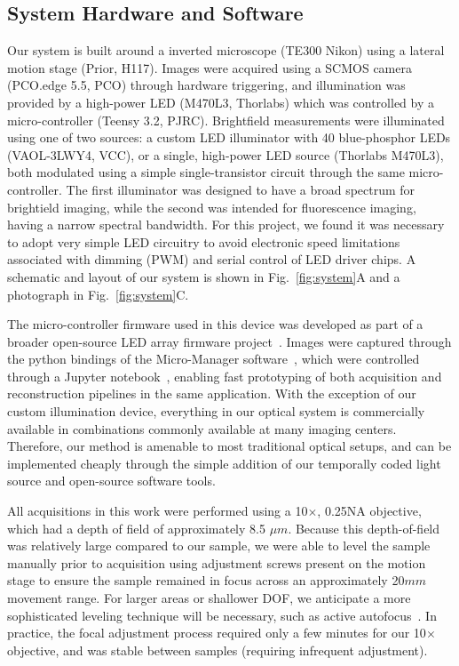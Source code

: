 \subsection{System Hardware and Software} \label{Sec:hardware}
Our system is built around a inverted microscope (TE300 Nikon) using a lateral motion stage (Prior, H117). Images were acquired using a SCMOS camera (PCO.edge 5.5, PCO) through hardware triggering, and illumination was provided by a high-power LED (M470L3, Thorlabs) which was controlled by a micro-controller (Teensy 3.2, PJRC). Brightfield measurements were illuminated using one of two sources: a custom LED illuminator with 40 blue-phosphor LEDs (VAOL-3LWY4, VCC), or a single, high-power LED source (Thorlabs M470L3), both modulated using a simple single-transistor circuit through the same micro-controller. The first illuminator was designed to have a broad spectrum for brightield imaging, while the second was intended for fluorescence imaging, having a narrow spectral bandwidth. For this project, we found it was necessary to adopt very simple LED circuitry to avoid electronic speed limitations associated with dimming (PWM) and serial control of LED driver chips. A schematic and layout of our system is shown in Fig.~\ref{fig:system}A and a photograph in Fig.~\ref{fig:system}C.

The micro-controller firmware used in this device was developed as part of a broader open-source LED array firmware project~\cite{illuminate}. Images were captured through the python bindings of the Micro-Manager software~\cite{micromanager}, which were controlled through a Jupyter notebook~\cite{Kluyver:2016aa}, enabling fast prototyping of both acquisition and reconstruction pipelines in the same application. With the exception of our custom illumination device, everything in our optical system is commercially available in combinations commonly available at many imaging centers. Therefore, our method is amenable to most traditional optical setups, and can be implemented cheaply through the simple addition of our temporally coded light source and open-source software tools.

All acquisitions in this work were performed using a 10$\times$, 0.25NA objective, which had a depth of field of approximately 8.5 $\mu m$. Because this depth-of-field was relatively large compared to our sample, we were able to level the sample manually prior to acquisition using adjustment screws present on the motion stage to ensure the sample remained in focus across an approximately 20$mm$ movement range. For larger areas or shallower DOF, we anticipate a more sophisticated leveling technique will be necessary, such as active autofocus~\cite{nikonperfect, zeissdefinite}. In practice, the focal adjustment process required only a few minutes for our 10$\times$ objective, and was stable between samples (requiring infrequent adjustment).

